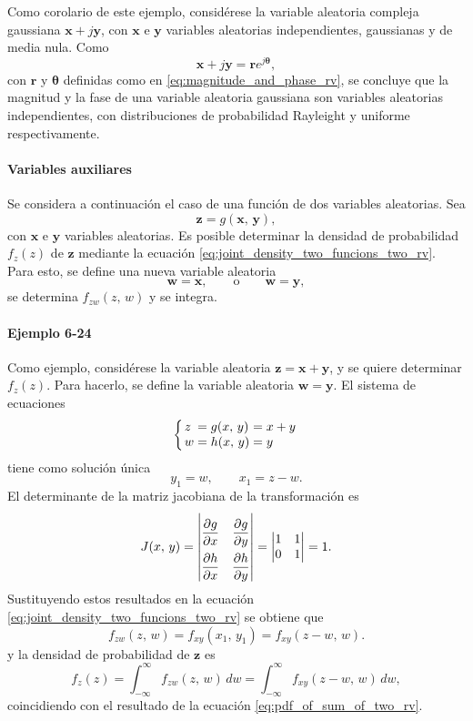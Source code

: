 \documentclass[a4paper]{report}
\newcommand{\x}{\mathbf{x}}
\newcommand{\y}{\mathbf{y}}
\newcommand{\w}{\mathbf{w}}
\newcommand{\z}{\mathbf{z}}
\begin{document}
Como corolario de este ejemplo, considérese la variable aleatoria compleja gaussiana \(\x+j\y\), con \(\x\) e \(\y\) variables aleatorias independientes, gaussianas y de media nula. Como
\[
 \x+j\y=\mathbf{r}e^{j\bm{\theta}},
\]
con \(\mathbf{r}\) y \(\bm{\theta}\) definidas como en \ref{eq:magnitude_and_phase_rv}, se concluye que la magnitud y la fase de una variable aleatoria gaussiana son variables aleatorias independientes, con distribuciones de probabilidad Rayleight y uniforme respectivamente.

\paragraph{Variables auxiliares} Se considera a continuación el caso de una función de dos variables aleatorias. Sea
\[
 \z=g(\x,\,\y),
\]
con \(\x\) e \(\y\) variables aleatorias. Es posible determinar la densidad de probabilidad \(f_z(z)\) de \(\z\) mediante la ecuación \ref{eq:joint_density_two_funcions_two_rv}. Para esto, se define una nueva variable aleatoria
\[
 \w=\x,\qquad\textrm{o}\qquad \w=\y,
\]
se determina \(f_{zw}(z,\,w)\) y se integra.

\paragraph{Ejemplo 6-24} Como ejemplo, considérese la variable aleatoria \(\z=\x+\y\), y se quiere determinar \(f_z(z)\). Para hacerlo, se define la variable aleatoria \(\w=\y\).
El sistema de ecuaciones
\[
\arraycolsep=1.4pt
 \left\{
 \begin{array}{lllll}
  z&=&g(x,\,y)&=&x+y\\
  w&=&h(x,\,y)&=&y
 \end{array} \right.
\]
tiene como solución única
\[
 y_1=w,\qquad x_1=z-w.
\]
El determinante de la matriz jacobiana de la transformación es
\[
\def\arraystretch{2.2}
 J(x,\,y)=
\begin{vmatrix}
   \dfrac{\partial g}{\partial x} & \dfrac{\partial g}{\partial y} \\
   \dfrac{\partial h}{\partial x} & \dfrac{\partial h}{\partial y}
\end{vmatrix}
=
\def\arraystretch{1}
\begin{vmatrix}
   1 & 1 \\
   0 & 1
\end{vmatrix}
=1.
\]
Sustituyendo estos resultados en la ecuación \ref{eq:joint_density_two_funcions_two_rv} se obtiene que
\[
 f_{zw}(z,\,w)=f_{xy}(x_1,\,y_1)=f_{xy}(z-w,\,w).
\]
y la densidad de probabilidad de \(\z\) es
\[
 f_z(z)=\int_{-\infty}^{\infty}f_{zw}(z,\,w)\,dw=\int_{-\infty}^{\infty}f_{xy}(z-w,\,w)\,dw,
\]
coincidiendo con el resultado de la ecuación \ref{eq:pdf_of_sum_of_two_rv}.
\end{document}
